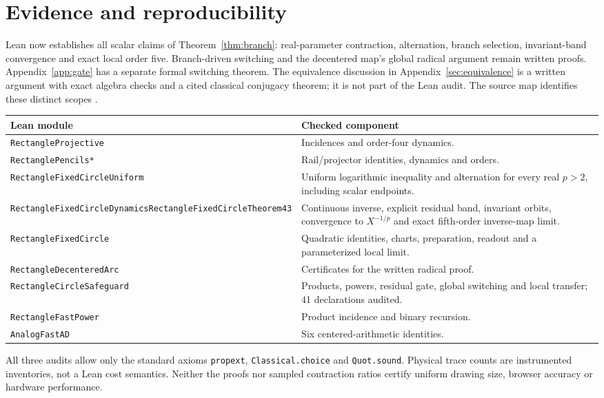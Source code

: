 \documentclass[11pt,a4paper]{article}
\begin{document}
\section{Evidence and reproducibility}\label{sec:scope}
Lean now establishes all scalar claims of Theorem~\ref{thm:branch}: real-parameter contraction, alternation, branch selection, invariant-band convergence and exact local order five. Branch-driven switching and the decentered map's global radical argument remain written proofs. Appendix~\ref{app:gate} has a separate formal switching theorem. The equivalence discussion in Appendix~\ref{sec:equivalence} is a written argument with exact algebra checks and a cited classical conjugacy theorem; it is not part of the Lean audit. The source map identifies these distinct scopes \cite{lean4,mathlib}.
\begin{center}\small
\begin{tabularx}{\linewidth}{@{}p{.34\linewidth}X@{}}\toprule
Lean module & Checked component\\\midrule
\texttt{RectangleProjective} & Incidences and order-four dynamics.\\
\texttt{RectanglePencils*} & Rail/projector identities, dynamics and orders.\\
\texttt{RectangleFixedCircle}\allowbreak\texttt{Uniform} & Uniform logarithmic inequality and alternation for every real $p>2$, including scalar endpoints.\\
\texttt{RectangleFixedCircle}\allowbreak\texttt{Dynamics}\newline\texttt{RectangleFixedCircle}\allowbreak\texttt{Theorem43} & Continuous inverse, explicit residual band, invariant orbits, convergence to $X^{-1/p}$ and exact fifth-order inverse-map limit.\\
\texttt{RectangleFixedCircle} & Quadratic identities, charts, preparation, readout and a parameterized local limit.\\
\texttt{RectangleDecenteredArc} & Certificates for the written radical proof.\\
\texttt{RectangleCircleSafeguard} & Products, powers, residual gate, global switching and local transfer; 41 declarations audited.\\
\texttt{RectangleFastPower} & Product incidence and binary recursion.\\
\texttt{AnalogFastAD} & Six centered-arithmetic identities.\\\bottomrule
\end{tabularx}\end{center}
All three audits allow only the standard axioms \texttt{propext}, \texttt{Classical.choice} and \texttt{Quot.sound}. Physical trace counts are instrumented inventories, not a Lean cost semantics. Neither the proofs nor sampled contraction ratios certify uniform drawing size, browser accuracy or hardware performance.
\end{document}

